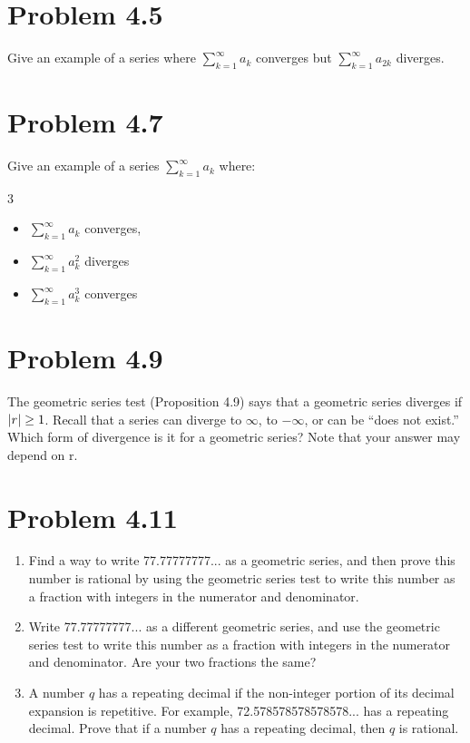 \documentclass[12pt]{report}
\begin{document}
\section{Problem 4.5}
    Give an example of a series where $\sum_{k = 1}^{\infty} a_k$ converges but $\sum_{k = 1}^{\infty} a_{2k}$ diverges.

\section{Problem 4.7}
    Give an example of a series $\sum_{k = 1}^{\infty} a_k$ where:
    \begin{multicols}{3}
        \begin{itemize}
            \item {\small $\sum_{k = 1}^{\infty} a_k$ converges,}
            \item {\small $\sum_{k = 1}^{\infty} a_k^2$ diverges}
            \item $\sum_{k = 1}^{\infty} a_k^3$ converges
        \end{itemize}
    \end{multicols}

\section{Problem 4.9}
    The geometric series test (Proposition 4.9) says  that a geometric series diverges if $\left| r \right| \geq 1$. 
    Recall that a series can  diverge to $\infty$, to $-\infty$, or can be ``does not exist.'' 
    Which form of divergence is it for a geometric series? 
    Note that your answer may depend on r. 

\section{Problem 4.11}
    \begin{enumerate}[label=(\alph*)]
        \item   Find a way to write 77.77777777... as a geometric series, and then prove this number is rational by using the geometric series test to write this number as a fraction with integers in the numerator and denominator.
        \item   Write 77.77777777... as a different geometric series, and use the geometric series test to write this number as a fraction with integers in the numerator and denominator. Are your two fractions the same?
        \item   A number $q$ has a repeating decimal if the non-integer portion of its decimal expansion is repetitive. For example, 72.578578578578578... has a repeating decimal. Prove that if a number $q$ has a repeating  decimal, then $q$ is rational. 
    \end{enumerate}
\pagebreak
\end{document}

